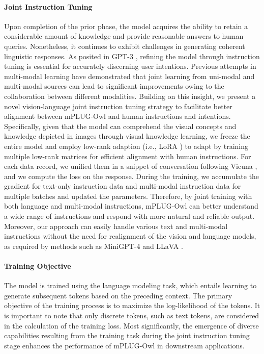\documentclass{article}
\newcommand{\modelname}{mPLUG-Owl\xspace}
\begin{document}
\paragraph{Joint Instruction Tuning}
Upon completion of the prior phase, the model acquires the ability to retain a considerable amount of knowledge and provide reasonable answers to human queries. Nonetheless, it continues to exhibit challenges in generating coherent linguistic responses. As posited in GPT-3 \citep{gpt3}, refining the model through instruction tuning is essential for accurately discerning user intentions.
Previous attempts \citep{mplug, mplug2} in multi-modal learning have demonstrated that joint learning from uni-modal and multi-modal sources can lead to significant improvements owing to the collaboration between different modalities. Building on this insight, we present a novel vision-language joint instruction tuning strategy to facilitate better alignment between \modelname and human instructions and intentions. 
Specifically, given that the model can comprehend the visual concepts and knowledge depicted in images through visual knowledge learning, we freeze the entire model and employ low-rank adaption (i.e., LoRA \citep{lora}) to adapt  by training multiple low-rank matrices for efficient alignment with human instructions.
For each data record, we unified them in a snippet of conversation following Vicuna \citep{vicuna}, and we compute the loss on the response. During the training, we accumulate the gradient for text-only instruction data and multi-modal instruction data for multiple batches and updated the parameters. Therefore, by joint training with both language and multi-modal instructions, \modelname can better understand a wide range of instructions and respond with more natural and reliable output. Moreover, our approach can easily handle various text and multi-modal instructions without the need for realignment of the vision and language models, as required by methods such as MiniGPT-4 \citep{minigpt4} and LLaVA \citep{llava}. 

\paragraph{Training Objective} 
The model is trained using the language modeling task, which entails learning to generate subsequent tokens based on the preceding context. The primary objective of the training process is to maximize the log-likelihood of the tokens. It is important to note that only discrete tokens, such as text tokens, are considered in the calculation of the training loss. Most significantly, the emergence of diverse capabilities resulting from the training task during the joint instruction tuning stage enhances the performance of \modelname in downstream applications.
\end{document}
